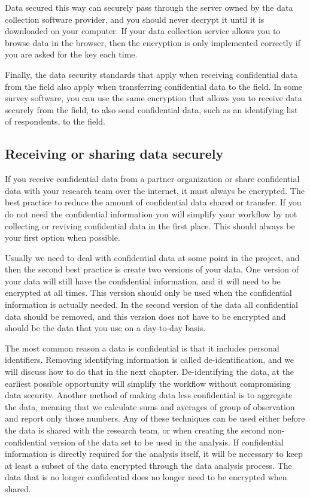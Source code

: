 Data secured this way can securely pass through the server owned by the data collection software provider,
and you should never decrypt it until it is downloaded on your computer.
If your data collection service allows you to browse data in the browser, 
then the encryption is only implemented correctly if you are asked for the key each time.

Finally, the data security standards that apply when receiving confidential data from the field
also apply when transferring confidential data to the field.
In some survey software, 
you can use the same encryption that allows you to receive data securely
from the field, to also send confidential data,
such as an identifying list of respondents, to the field.


\subsection{Receiving or sharing data securely}

If you receive confidential data from a partner organization 
or share confidential data with your research team over the internet,
it must always be encrypted.  
The best practice to reduce the amount of confidential data shared or transfer.
If you do not need the confidential information you will simplify your workflow
by not collecting or reviving confidential data in the first place.
This should always be your first option when possible.

Usually we need to deal with confidential data at some point in the project, 
and then the second best practice is create two versions of your data. 
One version of your data will still have the confidential information,
and it will need to be encrypted at all times. 
This version should only be used when the confidential information is actually needed.
In the second version of the data all confidential data should be removed,
and this version does not have to be encrypted 
and should be the data that you use on a day-to-day basis.

The most common reason a data is confidential is that it includes personal identifiers. 
Removing identifying information is called de-identification,
and we will discuss how to do that in the next chapter. 
De-identifying the data, at the earliest possible opportunity 
will simplify the workflow without compromising data security.
Another method of making data less confidential is to aggregate the data, 
meaning that we calculate sums and averages of group of observation and report only those numbers.
Any of these techniques can be used either before the data is shared with the research team,
or when creating the second non-confidential version of the data set to be used in the analysis.
If confidential information is directly required for the analysis itself,
it will be necessary to keep at least a subset of the data encrypted through the data analysis process.
The data that is no longer confidential does no longer need to be encrypted when shared.

